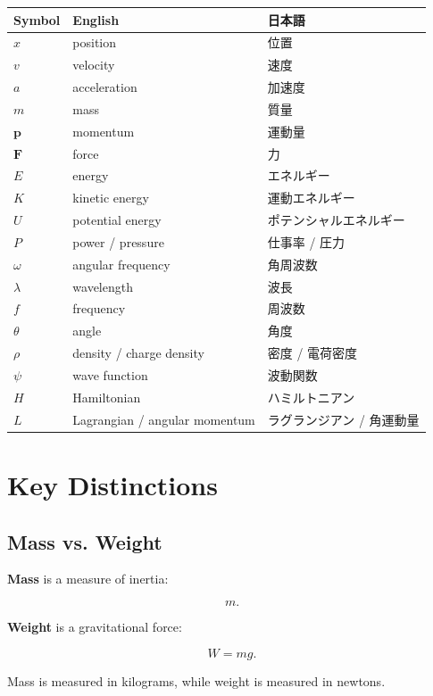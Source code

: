 \documentclass[11pt,a4paper]{article}
\begin{document}
\begin{longtable}{p{} p{} p{}}
\toprule
\textbf{Symbol} & \textbf{English} & \textbf{日本語} \\
\midrule
$x$ & position & 位置 \\
$v$ & velocity & 速度 \\
$a$ & acceleration & 加速度 \\
$m$ & mass & 質量 \\
$\bm{p}$ & momentum & 運動量 \\
$\bm{F}$ & force & 力 \\
$E$ & energy & エネルギー \\
$K$ & kinetic energy & 運動エネルギー \\
$U$ & potential energy & ポテンシャルエネルギー \\
$P$ & power / pressure & 仕事率 / 圧力 \\
$\omega$ & angular frequency & 角周波数 \\
$\lambda$ & wavelength & 波長 \\
$f$ & frequency & 周波数 \\
$\theta$ & angle & 角度 \\
$\rho$ & density / charge density & 密度 / 電荷密度 \\
$\psi$ & wave function & 波動関数 \\
$H$ & Hamiltonian & ハミルトニアン \\
$L$ & Lagrangian / angular momentum & ラグランジアン / 角運動量 \\
\bottomrule
\end{longtable}

\section{Key Distinctions}

\subsection{Mass vs. Weight}

\textbf{Mass} is a measure of inertia:

\[
m.
\]

\textbf{Weight} is a gravitational force:

\[
W=mg.
\]

Mass is measured in kilograms, while weight is measured in newtons.
\end{document}
